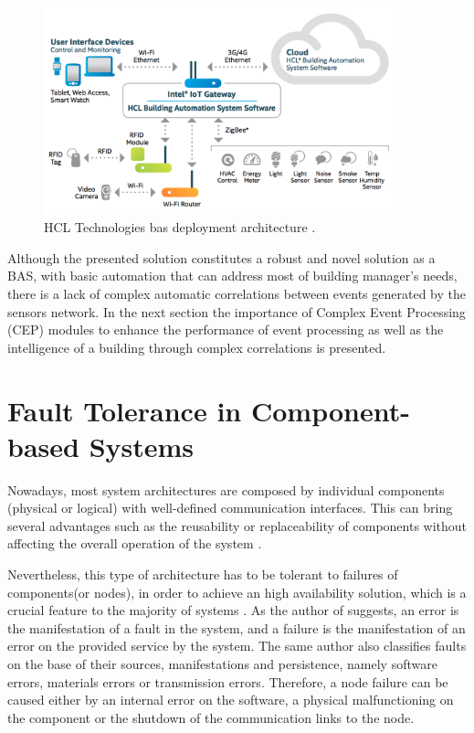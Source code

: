 \begin{figure}[H]
	\centering
	\includegraphics[width=0.9\textwidth]{figures/intelhclarch.png}
	\caption{HCL Technologies \ac{bas} deployment architecture \cite{hcl}.}
	\label{fig:intel}
\end{figure}

Although the presented solution constitutes a robust and novel solution as a BAS, with basic automation that can address most of building manager’s needs, there is a lack of complex automatic correlations between events generated by the sensors network. In the next section the importance of Complex Event Processing (CEP) modules to enhance the performance of event processing as well as the intelligence of a building through complex correlations is presented.



\section{Fault Tolerance in Component-based Systems}

Nowadays, most system architectures are composed by individual components (physical or logical) with well-defined communication interfaces. This can bring several advantages such as the reusability or replaceability of components without affecting the overall operation of the system \cite{TutorialsPoint}.

Nevertheless, this type of architecture has to be tolerant to failures of components(or nodes), in order to achieve an high availability solution, which is a crucial feature to the majority of systems \cite{Sun2014a}. As the author of \cite{Zaiter2013} suggests, an error is the manifestation of a fault in the system, and a failure is the manifestation of an error on the provided service by the system. The same author also classifies faults on the base of their sources, manifestations and persistence, namely software errors, materials errors or transmission errors. Therefore, a node failure can be caused either by an internal error on the software, a physical malfunctioning on the component or the shutdown of the communication links to the node.

